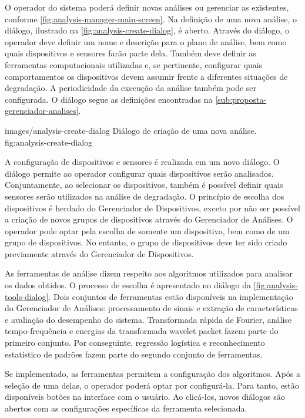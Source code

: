 O operador do sistema poderá definir novas análises ou gerenciar as existentes, conforme
\cref{fig:analysis-manager-main-screen}. Na definição de uma nova análise, o diálogo, ilustrado na
\cref{fig:analysis-create-dialog}, é aberto. Através do diálogo, o operador deve definir um nome e
descrição para o plano de análise, bem como quais dispositivos e sensores farão parte dela. Também
deve definir as ferramentas computacionais utilizadas e, se pertinente, configurar quais
comportamentos os dispositivos devem assumir frente a diferentes situações de degradação. A
periodicidade da execução da análise também pode ser configurada. O diálogo segue as definições
encontradas na \cref{sub:proposta-gerenciador-analises}.

  {images/analysis-create-dialog}
  {Diálogo de criação de uma nova análise.}
  {fig:analysis-create-dialog}

A configuração de dispositivos e sensores é realizada em um novo diálogo. O diálogo permite ao
operador configurar quais dispositivos serão analisados. Conjuntamente, ao selecionar os
dispositivos, também é possível definir quais sensores serão utilizados na análise de degradação. O
princípio de escolha dos dispositivos é herdado do Gerenciador de Dispositivos, exceto por não ser
possível a criação de novos grupos de dispositivos através do Gerenciador de Análises. O operador
pode optar pela escolha de somente um dispositivo, bem como de um grupo de dispositivos. No entanto,
o grupo de dispositivos deve ter sido criado previamente através do Gerenciador de Dispositivos.

As ferramentas de análise dizem respeito aos algoritmos utilizados para analisar os dados obtidos. O
processo de escolha é apresentado no diálogo da \cref{fig:analysis-tools-dialog}. Dois conjuntos de
ferramentas estão disponíveis na implementação do Gerenciador de Análises: processamento de sinais e
extração de características e avaliação do desempenho do sistema. Transformada rápida de Fourier,
análise tempo-frequência e energias da transformada wavelet packet fazem parte do primeiro conjunto.
Por conseguinte, regressão logística e reconhecimento estatístico de padrões fazem parte do segundo
conjunto de ferramentas.

Se implementado, as ferramentas permitem a configuração dos algoritmos. Após a seleção de uma delas,
o operador poderá optar por configurá-la. Para tanto, estão disponíveis botões na interface com o
usuário. Ao clicá-los, novos diálogos são abertos com as configurações específicas da ferramenta
selecionada.

